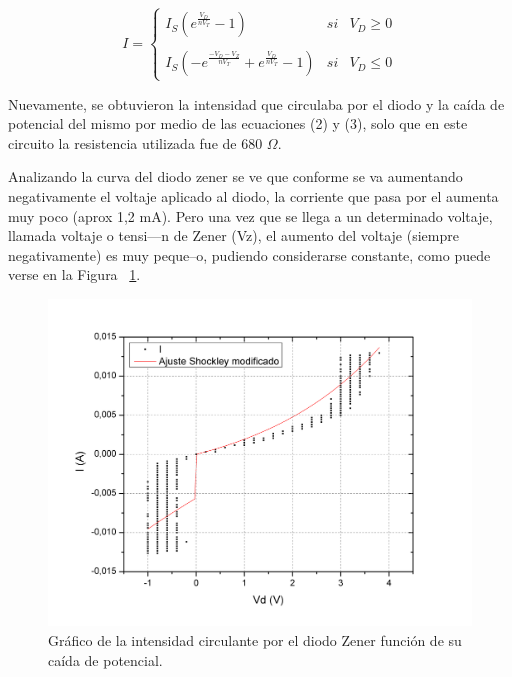 \documentclass[twoside,twocolumn,a4paper]{article}
\begin{document}
\begin{equation}
\label{eq:shockley}
I = \left\{ \begin{array}{lcc}
             I_{S}(e^\frac{V_{D}}{nV_{T}} - 1) &   si  & V_{D} \geq 0 \\
             \\ I_{S}(-e^\frac{-V_{D} - V_{Z}}{nV_{T}} + e^\frac{V_{D}}{nV_{T}} - 1) &  si  & V_{D} \leq 0
             \end{array}
   \right.
\end{equation}

Nuevamente, se obtuvieron la intensidad que circulaba por el diodo y la ca\'ida de potencial del mismo por medio de las ecuaciones (2) y (3), solo que en este circuito la resistencia utilizada fue de 680 $\Omega$.

Analizando la curva del diodo zener se ve que conforme se va aumentando negativamente el voltaje aplicado al diodo, la corriente que pasa por el aumenta muy poco (aprox 1,2 mA).
Pero una vez que se llega a un determinado voltaje, llamada voltaje o tensi—n de Zener (Vz), el aumento del voltaje (siempre negativamente) es muy peque–o, pudiendo considerarse constante, como puede verse en la Figura ~\ref{fig:zener_ajuste}.

\begin{figure}[h]
\includegraphics[width=\linewidth]{zener_ajuste.jpg}
\captionsetup{justification=centering}
\caption{Gr\'afico de la intensidad circulante por el diodo Zener funci\'on de su ca\'ida de potencial.}
\label{fig:zener_ajuste}
\end{figure} 
\end{document}
